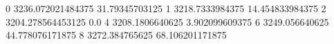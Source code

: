 0 3236.072021484375 31.79345703125
1 3218.7333984375 14.454833984375
2 3204.278564453125 0.0
4 3208.1806640625 3.902099609375
6 3249.056640625 44.778076171875
8 3272.384765625 68.106201171875
